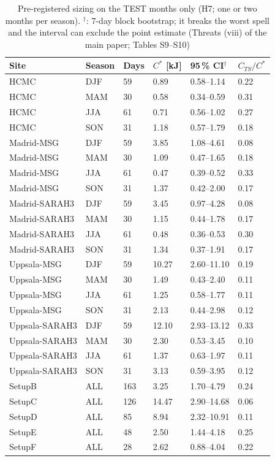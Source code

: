 \begin{table}[H]\centering\footnotesize\caption{Pre-registered sizing on the TEST months only (H7; one or two months per season). $^\dagger$: 7-day block bootstrap; it breaks the worst spell and the interval can exclude the point estimate (Threats (viii) of the main paper; Tables S9--S10)}\label{tab:s_monthly}
\begin{tabular}{@{}llllll@{}}\toprule
Site & Season & Days & $C^*$ [kJ] & 95\,\% CI$^\dagger$ & $C_{TS}/C^*$\\\midrule
HCMC & DJF & 59 & 0.89 & 0.58--1.14 & 0.22\\
HCMC & MAM & 30 & 0.58 & 0.34--0.59 & 0.31\\
HCMC & JJA & 61 & 0.71 & 0.56--1.02 & 0.27\\
HCMC & SON & 31 & 1.18 & 0.57--1.79 & 0.18\\
Madrid-MSG & DJF & 59 & 3.85 & 1.08--4.61 & 0.08\\
Madrid-MSG & MAM & 30 & 1.09 & 0.47--1.65 & 0.18\\
Madrid-MSG & JJA & 61 & 0.47 & 0.39--0.52 & 0.33\\
Madrid-MSG & SON & 31 & 1.37 & 0.42--2.00 & 0.17\\
Madrid-SARAH3 & DJF & 59 & 3.45 & 0.97--4.28 & 0.08\\
Madrid-SARAH3 & MAM & 30 & 1.15 & 0.44--1.78 & 0.17\\
Madrid-SARAH3 & JJA & 61 & 0.48 & 0.36--0.53 & 0.30\\
Madrid-SARAH3 & SON & 31 & 1.34 & 0.37--1.91 & 0.17\\
Uppsala-MSG & DJF & 59 & 10.27 & 2.60--11.10 & 0.19\\
Uppsala-MSG & MAM & 30 & 1.49 & 0.43--2.40 & 0.11\\
Uppsala-MSG & JJA & 61 & 1.25 & 0.58--1.77 & 0.11\\
Uppsala-MSG & SON & 31 & 2.13 & 0.44--2.98 & 0.12\\
Uppsala-SARAH3 & DJF & 59 & 12.10 & 2.93--13.12 & 0.33\\
Uppsala-SARAH3 & MAM & 30 & 2.30 & 0.53--3.45 & 0.10\\
Uppsala-SARAH3 & JJA & 61 & 1.37 & 0.63--1.97 & 0.11\\
Uppsala-SARAH3 & SON & 31 & 3.13 & 0.59--3.95 & 0.12\\
SetupB & ALL & 163 & 3.25 & 1.70--4.79 & 0.24\\
SetupC & ALL & 126 & 14.47 & 2.90--14.68 & 0.06\\
SetupD & ALL & 85 & 8.94 & 2.32--10.91 & 0.11\\
SetupE & ALL & 48 & 2.50 & 1.44--4.18 & 0.25\\
SetupF & ALL & 28 & 2.62 & 0.88--4.04 & 0.22\\
\bottomrule\end{tabular}\end{table}


